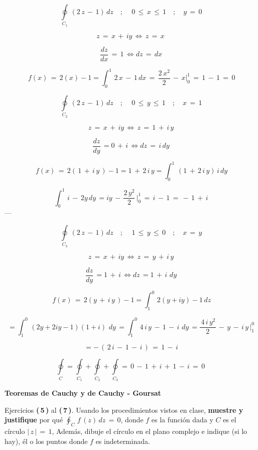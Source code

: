 \documentclass[a4paper,11pt,openany]{book}
\begin{document}
$$\displaystyle\oint\limits_{C_{1}}\,(2\,z\,-\,1)\,dz \quad;\quad \,0\,\leq\,x\,\leq\,1 \quad;\quad y\,=\,0 $$

$$ z\,=\,x\,+\,iy\,\iff \,z\,=\,x\, $$

$$ \dfrac{dz}{dx}\,=\,1\, \iff dz\,=\,dx $$

$$ \,f(x)\,=\,2(x)-1 = \displaystyle\int_{0}^{1}\,2\,x\,-\,1\,dx\,=\,\dfrac{2\,x^{2}}{2}\,-\,x \bigg|_{0}^{1}\,=\,1\,-\,1\,=\,0$$

$$\displaystyle\oint\limits_{C_{2}}\,(2\,z\,-\,1)\,dz \quad;\quad \,0\,\leq\,y\,\leq\,1 \quad;\quad x\,=\,1$$

$$ z\,=\,x\,+\,iy\,\iff \,z\,=\,1\,+\,i\,y$$

$$ \dfrac{dz}{dy}\,=0\,+\,i\, \iff dz\,=\,i\,dy$$

$$ \,f(x)\,=\,2(\,1\,+\,i\,y\,)-1 = 1\,+\,2\,i\,y = \displaystyle\int_{0}^{1}\,(1\,+\,2\,i\,y)\,i\,dy$$

$$ \displaystyle\int_{0}^{1}\,i\,-\,2y\,dy\,=iy\,-\,\dfrac{2\,y^{2}}{2}\, \bigg|_{0}^{1}\,=\,i\,-\,1\,=\,-\,1\,+\,i$$
---

$$\displaystyle\oint\limits_{C_{3}}\,(2\,z\,-\,1)\,dz \quad;\quad \,1\,\leq\,y\,\leq\,0 \quad;\quad x\,=\,y $$

$$ z\,=\,x\,+\,iy\,\iff \,z\,=\,y\,+\,i\,y $$

$$ \dfrac{dz}{dy}\,= 1\,+\,i\, \iff dz\,=1\,+\,i\,\,dy $$

$$ \,f(x)\,=\,2(y\,+\,i\,y\,)-1 = \displaystyle\int_{1}^{0}\,2(y+iy)-1\,dz$$

$$ =\displaystyle\int_{1}^{0}\,(2y+2iy-1)(1+i)\,\,dy\,= \displaystyle\int_{1}^{0}\,4\,i\,y\,-\,1\,-\,i\,\,dy\,= \dfrac{\,4\,i\,y^{2}}{2}\,-\,y\,-\,i\,y\, \bigg|_{1}^{0}$$

$$ = -\,(\,2\,i\,-\,1\,-\,i\,)\,=\,1\,-\,i $$

$$\displaystyle\oint\limits_{C} = \displaystyle\oint\limits_{C_{1}} + \displaystyle\oint\limits_{C_{2}} +\displaystyle\oint\limits_{C_{3}} = \,0\,-\,1\,+\,i\,+\,1\,-\,i\, = \boxed{\,0\,} $$


\begin{center}
\textbf{Teoremas de Cauchy y de Cauchy - Goursat}
\end{center}

Ejercicios \textbf{(\,5\,)} al \textbf{(\,7\,)}. Usando los procedimientos vistos en clase, \textbf{muestre y justifique} por qué $\oint_{C}\,f\,(z)\,dz\,=\,0$, donde $f$ es la función dada y $C$ es el círculo $|\,z\,|\,=\,1$, Además, dibuje el círculo en el plano complejo e indique (si lo hay), él o los puntos donde $f$ es indeterminada.\\
\end{document}

